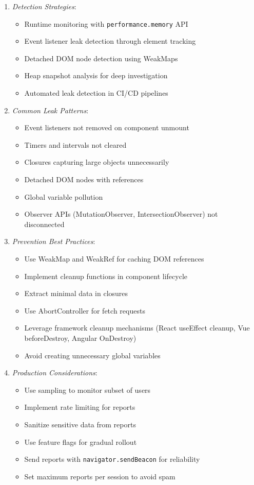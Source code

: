 \documentclass[11pt]{article}
\begin{document}
\begin{enumerate}
\item \emph{Detection Strategies}:

\begin{itemize}
\item Runtime monitoring with \texttt{performance.memory} API
\item Event listener leak detection through element tracking
\item Detached DOM node detection using WeakMaps
\item Heap snapshot analysis for deep investigation
\item Automated leak detection in CI/CD pipelines
\end{itemize}

\item \emph{Common Leak Patterns}:

\begin{itemize}
\item Event listeners not removed on component unmount
\item Timers and intervals not cleared
\item Closures capturing large objects unnecessarily
\item Detached DOM nodes with references
\item Global variable pollution
\item Observer APIs (MutationObserver, IntersectionObserver) not disconnected
\end{itemize}

\item \emph{Prevention Best Practices}:

\begin{itemize}
\item Use WeakMap and WeakRef for caching DOM references
\item Implement cleanup functions in component lifecycle
\item Extract minimal data in closures
\item Use AbortController for fetch requests
\item Leverage framework cleanup mechanisms (React useEffect cleanup, Vue beforeDestroy, Angular OnDestroy)
\item Avoid creating unnecessary global variables
\end{itemize}

\item \emph{Production Considerations}:

\begin{itemize}
\item Use sampling to monitor subset of users
\item Implement rate limiting for reports
\item Sanitize sensitive data from reports
\item Use feature flags for gradual rollout
\item Send reports with \texttt{navigator.sendBeacon} for reliability
\item Set maximum reports per session to avoid spam
\end{itemize}


\end{enumerate}
\end{document}
